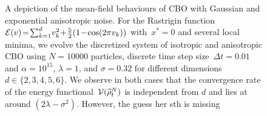 \documentclass[a4paper, 11pt]{article}
\newcommand{\globmin}{x^*}
\newcommand{\empmeasure}[1]{\widehat\rho_{#1}^N}
\begin{document}
\begin{figure}[!ht]
\centering
{}
\hspace{3em}

\caption{A depiction of the mean-field behaviours of CBO with Gaussian and exponential anisotropic noise. For the Rastrigin function~${\cal E}(v)\!=\!\sum_{k=1}^d \!v_k^2\!+\!\frac{5}{2}(1\!-\!\cos(2\pi v_k))$ with~$\globmin \!=\! 0$ and several local minima, we evolve the discretized system of isotropic and anisotropic CBO using $N = 10000$ particles, discrete time step size~$\Delta t = 0.01$ and \mbox{$\alpha = 10^{15}$}, $\lambda = 1$, and $\sigma = 0.32$ for different dimensions~$d\in\{2,3,4,5,6\}$.
We observe in both cases that the convergence rate of the energy functional~$\CV(\empmeasure{t})$ is independent from $d$ and lies at around $(2\lambda-\sigma^2)$. However, the {\color{red}guess her sth is missing}} \vspace{-1em}
\label{fig:meanfield}
\end{figure}


\end{document}
